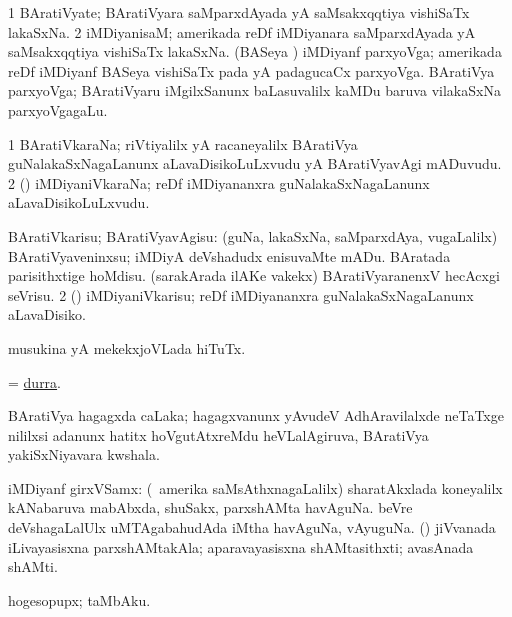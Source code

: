 \bentry
{}
\gl{\nA}
\bmng
\bnum
\num{1} BAratiVyate; BAratiVyara saMparxdAyada yA saMsakxqqtiya vishiSaTx lakaSxNa. 
\num{2} iMDiyanisaM; amerikada reDf iMDiyanara saMparxdAyada yA saMsakxqqtiya vishiSaTx lakaSxNa. 
 (BASeya \vi) 
\banum
{} iMDiyanf parxyoVga; amerikada reDf iMDiyanf BASeya vishiSaTx pada yA padagucaCx parxyoVga. 
 BAratiVya parxyoVga; BAratiVyaru iMgilxSanunx baLasuvalilx kaMDu baruva vilakaSxNa parxyoVgagaLu. 
\eanum
\numie
\enum
\emng
\eentry

\bentry
{}
\gl{\nA}
\bmng
\bnum
\num{1} BAratiVkaraNa; riVtiyalilx yA racaneyalilx BAratiVya guNalakaSxNagaLanunx aLavaDisikoLuLxvudu yA BAratiVyavAgi mADuvudu. 
\num{2} (\ame) iMDiyaniVkaraNa; reDf iMDiyananxra guNalakaSxNagaLanunx aLavaDisikoLuLxvudu. 
\enum
\emng
\eentry

\bentry
{}
\gl{\sakirx}
\bmng
\bnum
{} BAratiVkarisu; BAratiVyavAgisu: 
\banum
{} (guNa, lakaSxNa, saMparxdAya, \mo vugaLalilx) BAratiVyaveninxsu; iMDiyA deVshadudx enisuvaMte mADu. 
 BAratada parisithxtige hoMdisu. 
 (sarakArada ilAKe \mo vakekx) BAratiVyaranenxV hecAcxgi seVrisu. 
\eanum
\numie
\num{2} (\ame) iMDiyaniVkarisu; reDf iMDiyananxra guNalakaSxNagaLanunx aLavaDisiko. 
\enum
\emng
\eentry

\bentry
{}
\gl{\nA}
\bmng
musukina yA mekekxjoVLada hiTuTx. 
\emng
\eentry

\bentry
{}
\gl{\nA}
\bmng
= \hyperref{kandict_d.pdf}{D}{durra}{durra}. 
\emng
\eentry

\bentry
{}
\gl{\nA}
\bmng
BAratiVya hagagxda caLaka; hagagxvanunx yAvudeV AdhAravilalxde neTaTxge nililxsi adanunx hatitx hoVgutAtxreMdu heVLalAgiruva, BAratiVya yakiSxNiyavara kwshala. 
\emng
\eentry

\bentry
{}
\gl{\nA}
\bmng
iMDiyanf girxVSamx: 
\banum
{} (\kanu\ amerika saMsAthxnagaLalilx) sharatAkxlada koneyalilx kANabaruva mabAbxda, shuSakx, parxshAMta havAguNa. 
 beVre deVshagaLalUlx uMTAgabahudAda iMtha havAguNa, vAyuguNa. 
 (\rUpa) jiVvanada iLivayasisxna parxshAMtakAla; aparavayasisxna shAMtasithxti; avasAnada shAMti. 
\eanum
\emng
\eentry

\bentry
{}
\gl{\nA}
\bmng
hogesopupx; taMbAku. 
\emng
\eentry

